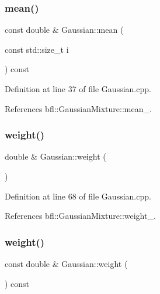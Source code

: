 \mbox{\label{classbfl_1_1Gaussian_a025d3985d2390300f2b999b71f1a2e3c}} 
\subsubsection{\texorpdfstring{mean()}{mean()}\hspace{0.1cm}{\footnotesize\ttfamily [6/6]}}
{\footnotesize\ttfamily const double \& Gaussian\+::mean (\begin{DoxyParamCaption}\item[{const std\+::size\+\_\+t}]{i }\end{DoxyParamCaption}) const}



Definition at line 37 of file Gaussian.\+cpp.



References bfl\+::\+Gaussian\+Mixture\+::mean\+\_\+.

\mbox{\label{classbfl_1_1Gaussian_aac053b84b9cf54506236bb38a9be7baa}} 
\subsubsection{\texorpdfstring{weight()}{weight()}\hspace{0.1cm}{\footnotesize\ttfamily [1/4]}}
{\footnotesize\ttfamily double \& Gaussian\+::weight (\begin{DoxyParamCaption}{ }\end{DoxyParamCaption})}



Definition at line 68 of file Gaussian.\+cpp.



References bfl\+::\+Gaussian\+Mixture\+::weight\+\_\+.

\mbox{\label{classbfl_1_1Gaussian_a84a8482a20306e29b508a7235c01f2a6}} 
\subsubsection{\texorpdfstring{weight()}{weight()}\hspace{0.1cm}{\footnotesize\ttfamily [2/4]}}
{\footnotesize\ttfamily const double \& Gaussian\+::weight (\begin{DoxyParamCaption}{ }\end{DoxyParamCaption}) const}



